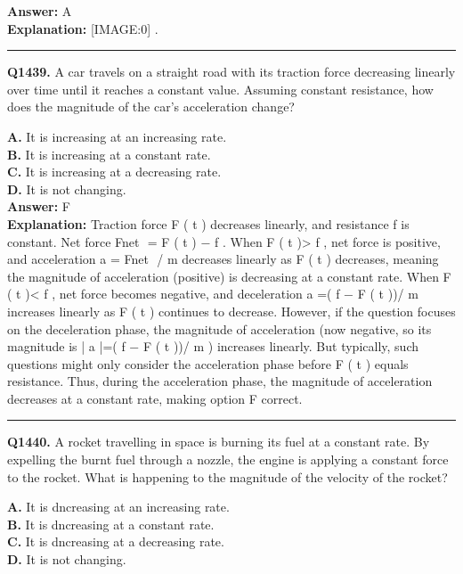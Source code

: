 \documentclass[12pt]{article}
\begin{document}
\textbf{Answer:} A \\
\textbf{Explanation:} [IMAGE:0]
.

\hrule
\vspace{1em}


\noindent
\textbf{Q1439.} A car travels on a straight road with its traction force decreasing linearly over time until it reaches a constant value. Assuming constant resistance, how does the magnitude of the car’s acceleration change?



\textbf{A.} It is increasing at an increasing rate. \\
\textbf{B.} It is increasing at a constant rate. \\
\textbf{C.} It is increasing at a decreasing rate. \\
\textbf{D.} It is not changing. \\

\textbf{Answer:} F \\
\textbf{Explanation:} Traction force
F
(
t
) decreases linearly, and resistance
f
is constant. Net force
Fnet
​
=
F
(
t
)
−
f
. When
F
(
t
)>
f
, net force is positive, and acceleration
a
=
Fnet
​
/
m
decreases linearly as
F
(
t
) decreases, meaning the magnitude of acceleration (positive) is decreasing at a constant rate. When
F
(
t
)<
f
, net force becomes negative, and deceleration
a
=(
f
−
F
(
t
))/
m
increases linearly as
F
(
t
) continues to decrease. However, if the question focuses on the deceleration phase, the magnitude of acceleration (now negative, so its magnitude is |
a
|=(
f
−
F
(
t
))/
m
) increases linearly. But typically, such questions might only consider the acceleration phase before
F
(
t
) equals resistance. Thus, during the acceleration phase, the magnitude of acceleration decreases at a constant rate, making option F correct.

\hrule
\vspace{1em}


\noindent
\textbf{Q1440.} A rocket travelling in space is burning its fuel at a constant rate. By expelling the burnt fuel through a nozzle, the engine is applying a constant force to the rocket.
What is happening to the magnitude of the velocity of the rocket?



\textbf{A.} It is dncreasing at an increasing rate. \\
\textbf{B.} It is dncreasing at a constant rate. \\
\textbf{C.} It is dncreasing at a decreasing rate. \\
\textbf{D.} It is not changing. \\
\end{document}

